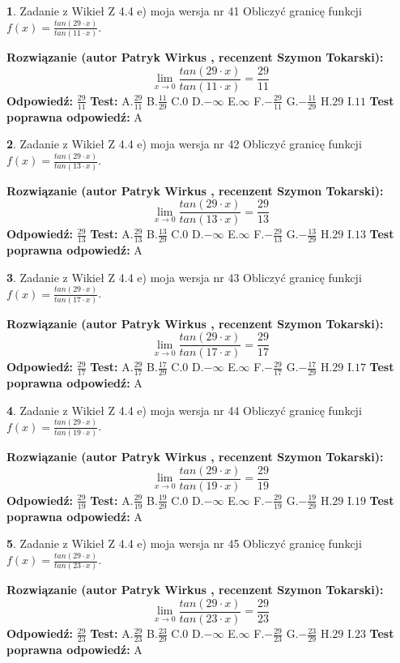 \documentclass[12pt, a4paper]{article}
\theoremstyle{definition} %
\newtheorem{zad}{}
\newcommand{\zadStart}[1]{\begin{zad}#1\newline}
\newcommand{\zadStop}{\end{zad}}
\newcommand{\rozwStart}[2]{\noindent \textbf{Rozwiązanie (autor #1 , recenzent #2): }\newline}
\newcommand{\rozwStop}{\newline}
\newcommand{\odpStart}{\noindent \textbf{Odpowiedź:}\newline}
\newcommand{\odpStop}{\newline}
\newcommand{\testStart}{\noindent \textbf{Test:}\newline}
\newcommand{\testStop}{\newline}
\newcommand{\kluczStart}{\noindent \textbf{Test poprawna odpowiedź:}\newline}
\newcommand{\kluczStop}{\newline}
\begin{document}
\zadStart{Zadanie z Wikieł Z 4.4 e) moja wersja nr 41}
Obliczyć granicę funkcji $f(x)=\frac{tan(29\cdot x)}{tan(11\cdot x)}$.
\zadStop
\rozwStart{Patryk Wirkus}{Szymon Tokarski}
$$\lim\limits_{x\to 0}\frac{tan(29\cdot x)}{tan(11\cdot x)}=
\frac{29}{11}$$
\rozwStop
\odpStart
$\frac{29}{11}$
\odpStop
\testStart
A.$\frac{29}{11}$
B.$\frac{11}{29}$
C.$0$
D.$-\infty$
E.$\infty$
F.$-\frac{29}{11}$
G.$-\frac{11}{29}$
H.$29$
I.$11$
\testStop
\kluczStart
A
\kluczStop



\zadStart{Zadanie z Wikieł Z 4.4 e) moja wersja nr 42}
Obliczyć granicę funkcji $f(x)=\frac{tan(29\cdot x)}{tan(13\cdot x)}$.
\zadStop
\rozwStart{Patryk Wirkus}{Szymon Tokarski}
$$\lim\limits_{x\to 0}\frac{tan(29\cdot x)}{tan(13\cdot x)}=
\frac{29}{13}$$
\rozwStop
\odpStart
$\frac{29}{13}$
\odpStop
\testStart
A.$\frac{29}{13}$
B.$\frac{13}{29}$
C.$0$
D.$-\infty$
E.$\infty$
F.$-\frac{29}{13}$
G.$-\frac{13}{29}$
H.$29$
I.$13$
\testStop
\kluczStart
A
\kluczStop



\zadStart{Zadanie z Wikieł Z 4.4 e) moja wersja nr 43}
Obliczyć granicę funkcji $f(x)=\frac{tan(29\cdot x)}{tan(17\cdot x)}$.
\zadStop
\rozwStart{Patryk Wirkus}{Szymon Tokarski}
$$\lim\limits_{x\to 0}\frac{tan(29\cdot x)}{tan(17\cdot x)}=
\frac{29}{17}$$
\rozwStop
\odpStart
$\frac{29}{17}$
\odpStop
\testStart
A.$\frac{29}{17}$
B.$\frac{17}{29}$
C.$0$
D.$-\infty$
E.$\infty$
F.$-\frac{29}{17}$
G.$-\frac{17}{29}$
H.$29$
I.$17$
\testStop
\kluczStart
A
\kluczStop



\zadStart{Zadanie z Wikieł Z 4.4 e) moja wersja nr 44}
Obliczyć granicę funkcji $f(x)=\frac{tan(29\cdot x)}{tan(19\cdot x)}$.
\zadStop
\rozwStart{Patryk Wirkus}{Szymon Tokarski}
$$\lim\limits_{x\to 0}\frac{tan(29\cdot x)}{tan(19\cdot x)}=
\frac{29}{19}$$
\rozwStop
\odpStart
$\frac{29}{19}$
\odpStop
\testStart
A.$\frac{29}{19}$
B.$\frac{19}{29}$
C.$0$
D.$-\infty$
E.$\infty$
F.$-\frac{29}{19}$
G.$-\frac{19}{29}$
H.$29$
I.$19$
\testStop
\kluczStart
A
\kluczStop



\zadStart{Zadanie z Wikieł Z 4.4 e) moja wersja nr 45}
Obliczyć granicę funkcji $f(x)=\frac{tan(29\cdot x)}{tan(23\cdot x)}$.
\zadStop
\rozwStart{Patryk Wirkus}{Szymon Tokarski}
$$\lim\limits_{x\to 0}\frac{tan(29\cdot x)}{tan(23\cdot x)}=
\frac{29}{23}$$
\rozwStop
\odpStart
$\frac{29}{23}$
\odpStop
\testStart
A.$\frac{29}{23}$
B.$\frac{23}{29}$
C.$0$
D.$-\infty$
E.$\infty$
F.$-\frac{29}{23}$
G.$-\frac{23}{29}$
H.$29$
I.$23$
\testStop
\kluczStart
A
\kluczStop
\end{document}
